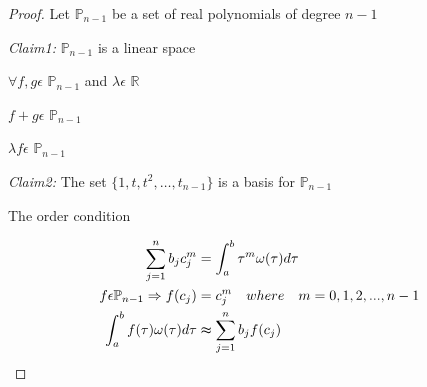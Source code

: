 \documentclass[12pt,a4paper]{article}
\begin{document}
\begin{proof}
Let $\mathbb{P}_{n-1}$ be a set of real polynomials of degree $n-1$

\noindent
\textit{Claim1:} $\mathbb{P}_{n-1}$ is a linear space

$\forall f,g \epsilon$ $\mathbb{P}_{n-1}$ and $\lambda \epsilon$ $\mathbb{R}$

$f + g \epsilon$ $\mathbb{P}_{n-1}$

$\lambda f \epsilon$ $ \mathbb{P}_{n-1}$

\noindent
\textit{Claim2:} The set $\lbrace 1,t,t^2,\ldots, t_{n-1}\rbrace$ is a basis for $\mathbb{P}_{n-1}$

\noindent
The order condition

\begin{align*}
\sum_{j=1}^n b_jc_j^m &= \int_a^b\tau^m \omega(\tau)d\tau \\
f\epsilon \mathbb{P}_{n-1} \Rightarrow f(c_j) &= c_j^m  \quad where \quad m = 0,1,2,..., n-1 \\
\int_a^b f(\tau)\omega(\tau)d\tau &\thickapprox \sum_{j=1}^nb_jf(c_j)
\end{align*}

\noindent


\end{proof}
\end{document}
